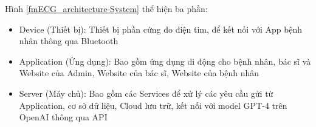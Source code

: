 Hình \ref{fmECG_architecture-System} thể hiện ba phần: 

\begin{adjustwidth}{1.5em}{}
\begin{itemize}
  \item Device (Thiết bị): Thiết bị phần cứng đo điện tim, để kết nối với App bệnh nhân thông qua Bluetooth 
  \item Application (Ứng dụng): Bao gồm ứng dụng di động cho bệnh nhân, bác sĩ và Website của Admin, Website của bác sĩ, Website của bệnh nhân
  \item Server (Máy chủ): Bao gồm các Services để xử lý các yêu cầu gửi từ Application, cơ sở dữ liệu, Cloud lưu trữ, kết nối với model GPT-4 trên OpenAI thông qua API
\end{itemize}
\end{adjustwidth}

